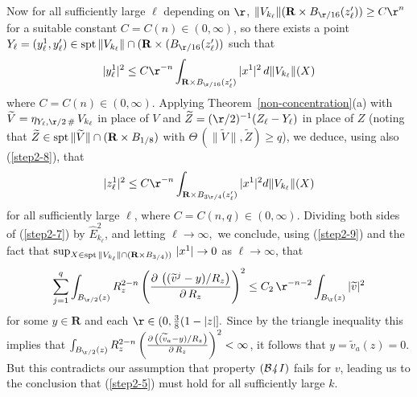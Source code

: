 \documentclass[a4paper,11pt]{amsart}
\begin{document}
Now for all sufficiently large $\ell$ depending on $\r$, 
$\|V_{k_{\ell}}\|({\mathbf R} \times B_{\r/16}(z^{\prime}_{\ell})) \geq 
C\r^{n}$ for a suitable constant $C = C(n) \in (0, \infty)$, so there exists a  
point $Y_{\ell} = (y_{\ell}^{1}, y_{\ell}^{\prime})  \in {\rm spt} \, \|V_{k_{\ell}}\| 
\cap ({\mathbf R} \times (B_{\r/16}(z^{\prime}_{\ell}))$ such that 
\begin{equation}\label{step2-8}
|y_{\ell}^{1}|^{2} \leq C\r^{-n} \int_{{\mathbf R} \times B_{\r/16}(z^{\prime}_{\ell})} |x^{1}|^{2} \, d\|V_{k_{\ell}}\|(X)
\end{equation}
where $C = C(n) \in (0, \infty).$ Applying Theorem~\ref{non-concentration}(a)
with ${\widetilde V} = \eta_{Y_{\ell}, \r/2 \, \#} \, V_{k_{\ell}}$ in place of $V$ and ${\widetilde Z} = (\r/2)^{-1}(Z_{\ell} - Y_{\ell})$ in place of $Z$ (noting that ${\widetilde Z} \in {\rm spt} \, \|{\widetilde V}\| \cap 
({\mathbf R} \times B_{1/8})$ with $\Theta \, (\|{\widetilde V}\|, {\widetilde Z}) \geq q$), we deduce, 
using also (\ref{step2-8}), that 
\begin{equation}\label{step2-9}
|z^{1}_{\ell}|^{2} \leq C\r^{-n}\int_{{\mathbf R} \times B_{3\r/4}(z_{\ell}^{\prime})}|x^{1}|^{2}d\|V_{k_{\ell}}\|(X)
\end{equation}
for all sufficiently large $\ell$, where $C = C(n, q) \in (0, \infty).$ Dividing both sides of 
(\ref{step2-7}) by ${\hat E}_{k_{\ell}}^{2}$, and letting $\ell \to \infty,$ we conclude, using 
(\ref{step2-9}) and the fact that 
$\sup_{X \in {\rm spt} \, \|V_{k_{\ell}}\| \cap ({\mathbf R} \times B_{3/4}))} \, |x^{1}| \to 0$ as $\ell \to \infty$, that 
\begin{equation}\label{step2-9-1}
\sum_{j=1}^{q}\int_{B_{\r/2}(z)} R_{z}^{2-n} \left(\frac{\partial \, 
\left((\widetilde{v}^{j} - y)/R_{z}\right)}{\partial \, R_{z}}\right)^{2} \leq C_{2} \, \r^{-n-2}\int_{B_{\r}(z)}|\widetilde{v}|^{2}
\end{equation}
for some $y \in {\mathbf R}$ and each $\r \in (0, \frac{3}{8}(1 - |z|].$ Since by the triangle inequality this implies that 
$\int_{B_{\r/2}(z)} R_{z}^{2-n} \left(\frac{\partial \, 
\left((\widetilde{v}_{a} - y)/R_{z}\right)}{\partial \, R_{z}}\right)^{2} < \infty$, it follows that $y = \widetilde{v}_{a}(z) = 0.$ But this contradicts our assumption that property $({\mathcal B{\emph 4 \, I}})$ fails for $v$, leading us to the conclusion that
(\ref{step2-5}) must hold for all sufficiently large $k$.
 
\end{document}
